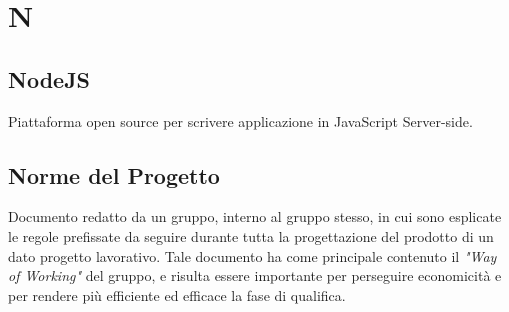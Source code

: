 \section*{N}

\subsection{NodeJS}
Piattaforma open source per scrivere applicazione in JavaScript Server-side.

\subsection{Norme del Progetto}
Documento redatto da un gruppo, interno al gruppo stesso, in cui sono esplicate le regole prefissate da seguire durante tutta la progettazione del prodotto di un dato progetto lavorativo. Tale documento ha come principale contenuto il \textit{"Way of Working"} del gruppo, e risulta essere importante per perseguire economicità e per rendere più efficiente ed efficace la fase di qualifica.
